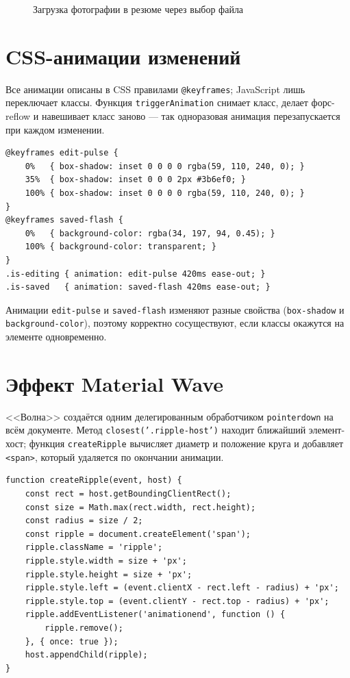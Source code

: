 \begin{figure}[h]
  \centering
  \caption{Загрузка фотографии в резюме через выбор файла}
  \label{fig:photo}
\end{figure}

\section{CSS-анимации изменений}

Все анимации описаны в CSS правилами \texttt{@keyframes}; JavaScript лишь
переключает классы. Функция \texttt{triggerAnimation} снимает класс, делает
форс-reflow и навешивает класс заново --- так одноразовая анимация
перезапускается при каждом изменении.

\begin{lstlisting}[caption={Анимации входа в правку и сохранения (\texttt{style.css})},captionpos=b]
@keyframes edit-pulse {
    0%   { box-shadow: inset 0 0 0 0 rgba(59, 110, 240, 0); }
    35%  { box-shadow: inset 0 0 0 2px #3b6ef0; }
    100% { box-shadow: inset 0 0 0 0 rgba(59, 110, 240, 0); }
}
@keyframes saved-flash {
    0%   { background-color: rgba(34, 197, 94, 0.45); }
    100% { background-color: transparent; }
}
.is-editing { animation: edit-pulse 420ms ease-out; }
.is-saved   { animation: saved-flash 420ms ease-out; }
\end{lstlisting}

Анимации \texttt{edit-pulse} и \texttt{saved-flash} изменяют разные свойства
(\texttt{box-shadow} и \texttt{background-color}), поэтому корректно
сосуществуют, если классы окажутся на элементе одновременно.

\section{Эффект Material Wave}

<<Волна>> создаётся одним делегированным обработчиком \texttt{pointerdown}
на всём документе. Метод \texttt{closest('.ripple-host')} находит ближайший
элемент-хост; функция \texttt{createRipple} вычисляет диаметр и положение
круга и добавляет \texttt{<span>}, который удаляется по окончании анимации.

\begin{lstlisting}[caption={Создание <<волны>> (\texttt{resume.js})},captionpos=b]
function createRipple(event, host) {
    const rect = host.getBoundingClientRect();
    const size = Math.max(rect.width, rect.height);
    const radius = size / 2;
    const ripple = document.createElement('span');
    ripple.className = 'ripple';
    ripple.style.width = size + 'px';
    ripple.style.height = size + 'px';
    ripple.style.left = (event.clientX - rect.left - radius) + 'px';
    ripple.style.top = (event.clientY - rect.top - radius) + 'px';
    ripple.addEventListener('animationend', function () {
        ripple.remove();
    }, { once: true });
    host.appendChild(ripple);
}
\end{lstlisting}

